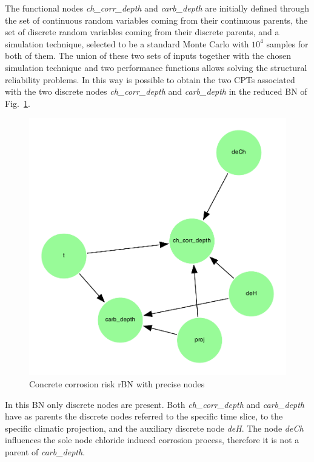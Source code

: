 The functional nodes \textit{ch\_corr\_depth} and \textit{carb\_depth} are initially defined through the set of continuous random variables coming from their continuous parents, the set of discrete random variables coming from their discrete parents, and a simulation technique, selected to be a standard Monte Carlo with $10^4$ samples for both of them.
The union of these two sets of inputs together with the chosen simulation technique and two performance functions allows solving the structural reliability problems. 
In this way is possible to obtain the two CPTs associated with the two discrete nodes \textit{ch\_corr\_depth} and \textit{carb\_depth} in the reduced BN of Fig.~\ref{fig:precise_rbn}. 

\begin{figure}[H]
    \centering
    \includegraphics[width=\linewidth]{imgs/pdfs/13_total_rbn_precise.pdf}
    \caption{Concrete corrosion risk rBN with precise nodes}\label{fig:precise_rbn}
\end{figure}

In this BN only discrete nodes are present. Both \textit{ch\_corr\_depth} and \textit{carb\_depth} have as parents the discrete nodes referred to the specific time slice, to the specific climatic projection, and the auxiliary discrete node \textit{deH}. The node \textit{deCh} influences the sole node chloride induced corrosion process, therefore it is not a parent of \textit{carb\_depth}.

